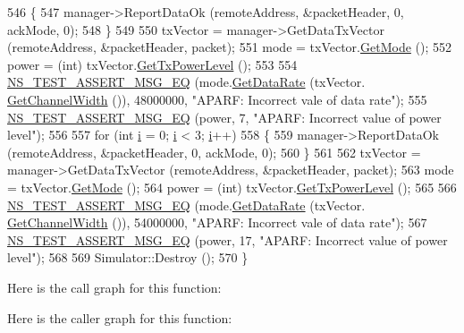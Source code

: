 \begin{DoxyCode}
546     \{
547       manager->ReportDataOk (remoteAddress, &packetHeader, 0, ackMode, 0);
548     \}
549 
550   txVector = manager->GetDataTxVector (remoteAddress, &packetHeader, packet);
551   mode = txVector.\hyperlink{classns3_1_1WifiTxVector_a497b1f11cad4b8b26251dfa07c9ad1d6}{GetMode} ();
552   power = (int) txVector.\hyperlink{classns3_1_1WifiTxVector_a7c98bd9609ff1c5cefa6e22d6908a2fe}{GetTxPowerLevel} ();
553 
554   \hyperlink{group__testing_ga2a9d78cffb3db8e867c35fff0b698cf5}{NS\_TEST\_ASSERT\_MSG\_EQ} (mode.\hyperlink{classns3_1_1WifiMode_adcfbe150f69da720db23387f733b8a52}{GetDataRate} (txVector.
      \hyperlink{classns3_1_1WifiTxVector_a1f8bfa51778a3e217581eb665f059564}{GetChannelWidth} ()), 48000000, \textcolor{stringliteral}{"APARF: Incorrect vale of data rate"});
555   \hyperlink{group__testing_ga2a9d78cffb3db8e867c35fff0b698cf5}{NS\_TEST\_ASSERT\_MSG\_EQ} (power, 7, \textcolor{stringliteral}{"APARF: Incorrect value of power level"});
556 
557   \textcolor{keywordflow}{for} (\textcolor{keywordtype}{int} \hyperlink{bernuolliDistribution_8m_a6f6ccfcf58b31cb6412107d9d5281426}{i} = 0; \hyperlink{bernuolliDistribution_8m_a6f6ccfcf58b31cb6412107d9d5281426}{i} < 3; \hyperlink{bernuolliDistribution_8m_a6f6ccfcf58b31cb6412107d9d5281426}{i}++)
558     \{
559       manager->ReportDataOk (remoteAddress, &packetHeader, 0, ackMode, 0);
560     \}
561 
562   txVector = manager->GetDataTxVector (remoteAddress, &packetHeader, packet);
563   mode = txVector.\hyperlink{classns3_1_1WifiTxVector_a497b1f11cad4b8b26251dfa07c9ad1d6}{GetMode} ();
564   power = (int) txVector.\hyperlink{classns3_1_1WifiTxVector_a7c98bd9609ff1c5cefa6e22d6908a2fe}{GetTxPowerLevel} ();
565 
566   \hyperlink{group__testing_ga2a9d78cffb3db8e867c35fff0b698cf5}{NS\_TEST\_ASSERT\_MSG\_EQ} (mode.\hyperlink{classns3_1_1WifiMode_adcfbe150f69da720db23387f733b8a52}{GetDataRate} (txVector.
      \hyperlink{classns3_1_1WifiTxVector_a1f8bfa51778a3e217581eb665f059564}{GetChannelWidth} ()), 54000000, \textcolor{stringliteral}{"APARF: Incorrect vale of data rate"});
567   \hyperlink{group__testing_ga2a9d78cffb3db8e867c35fff0b698cf5}{NS\_TEST\_ASSERT\_MSG\_EQ} (power, 17, \textcolor{stringliteral}{"APARF: Incorrect value of power level"});
568 
569   Simulator::Destroy ();
570 \}
\end{DoxyCode}


Here is the call graph for this function\+:




Here is the caller graph for this function\+:


